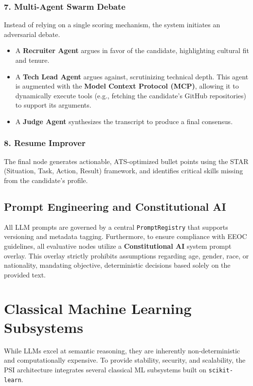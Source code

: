 \documentclass[10pt,journal,compsoc]{IEEEtran}
\begin{document}
\subsubsection{7. Multi-Agent Swarm Debate}
Instead of relying on a single scoring mechanism, the system initiates an adversarial debate. 
\begin{itemize}
    \item A \textbf{Recruiter Agent} argues in favor of the candidate, highlighting cultural fit and tenure.
    \item A \textbf{Tech Lead Agent} argues against, scrutinizing technical depth. This agent is augmented with the \textbf{Model Context Protocol (MCP)}, allowing it to dynamically execute tools (e.g., fetching the candidate's GitHub repositories) to support its arguments.
    \item A \textbf{Judge Agent} synthesizes the transcript to produce a final consensus.
\end{itemize}

\subsubsection{8. Resume Improver}
The final node generates actionable, ATS-optimized bullet points using the STAR (Situation, Task, Action, Result) framework, and identifies critical skills missing from the candidate's profile.

\subsection{Prompt Engineering and Constitutional AI}
All LLM prompts are governed by a central \texttt{PromptRegistry} that supports versioning and metadata tagging. Furthermore, to ensure compliance with EEOC guidelines, all evaluative nodes utilize a \textbf{Constitutional AI} system prompt overlay. This overlay strictly prohibits assumptions regarding age, gender, race, or nationality, mandating objective, deterministic decisions based solely on the provided text.


\section{Classical Machine Learning Subsystems}\label{sec:classical_ml}

While LLMs excel at semantic reasoning, they are inherently non-deterministic and computationally expensive. To provide stability, security, and scalability, the PSI architecture integrates several classical ML subsystems built on \texttt{scikit-learn}.
\end{document}
